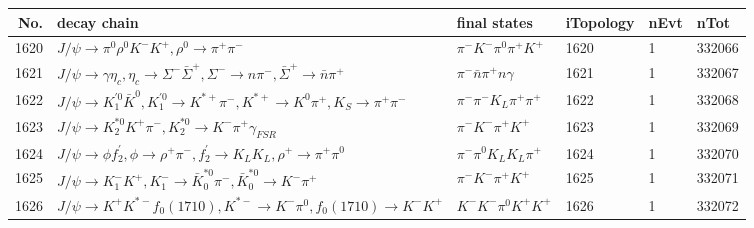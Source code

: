 \begin{table}[htbp] 
\begin{center}
\begin{small}
\begin{tabular}{rlllll}\hline\hline
 No. & decay chain & final states &  iTopology & nEvt & nTot \\\hline
1620&$J/\psi       \rightarrow \pi^{0}        \rho^{0}      K^{-}          K^{+}          , \rho^{0}       \rightarrow \pi^{+}        \pi^{-}        $&$\pi^{-}        K^{-}          \pi^{0}        \pi^{+}        K^{+}          $& 1620&    1&332066\\
1621&$J/\psi       \rightarrow \gamma       \eta_{c}    , \eta_{c}     \rightarrow \Sigma^-          \bar{\Sigma}^+   , \Sigma^-           \rightarrow n                 \pi^{-}        , \bar{\Sigma}^+    \rightarrow \bar{n}          \pi^{+}        $&$\pi^{-}        \bar{n}          \pi^{+}        n                 \gamma       $& 1621&    1&332067\\
1622&$J/\psi       \rightarrow K_1^{'0}      \bar{K}^{0}   , K_1^{'0}       \rightarrow K^{*+}         \pi^{-}        , K^{*+}          \rightarrow K^{0}          \pi^{+}        , K_{S}           \rightarrow \pi^{+}        \pi^{-}        $&$\pi^{-}        \pi^{-}        K_{L}          \pi^{+}        \pi^{+}        $& 1622&    1&332068\\
1623&$J/\psi       \rightarrow K_2^{*0}       K^{+}          \pi^{-}        , K_2^{*0}        \rightarrow K^{-}          \pi^{+}        \gamma_{FSR} $&$\pi^{-}        K^{-}          \pi^{+}        K^{+}          $& 1623&    1&332069\\
1624&$J/\psi       \rightarrow \phi           f_2^{'}       , \phi            \rightarrow \rho^{+}      \pi^{-}        , f_2^{'}        \rightarrow K_{L}          K_{L}          , \rho^{+}       \rightarrow \pi^{+}        \pi^{0}        $&$\pi^{-}        \pi^{0}        K_{L}          K_{L}          \pi^{+}        $& 1624&    1&332070\\
1625&$J/\psi       \rightarrow K_{1}^{-}      K^{+}          , K_{1}^{-}       \rightarrow \bar{K}_0^{*0}\pi^{-}        , \bar{K}_0^{*0} \rightarrow K^{-}          \pi^{+}        $&$\pi^{-}        K^{-}          \pi^{+}        K^{+}          $& 1625&    1&332071\\
1626&$J/\psi       \rightarrow K^{+}          K^{*-}         f_{0}(1710)    , K^{*-}          \rightarrow K^{-}          \pi^{0}        , f_{0}(1710)     \rightarrow K^{-}          K^{+}          $&$K^{-}          K^{-}          \pi^{0}        K^{+}          K^{+}          $& 1626&    1&332072\\

\end{tabular}
\end{small}
\end{center}
\end{table}

